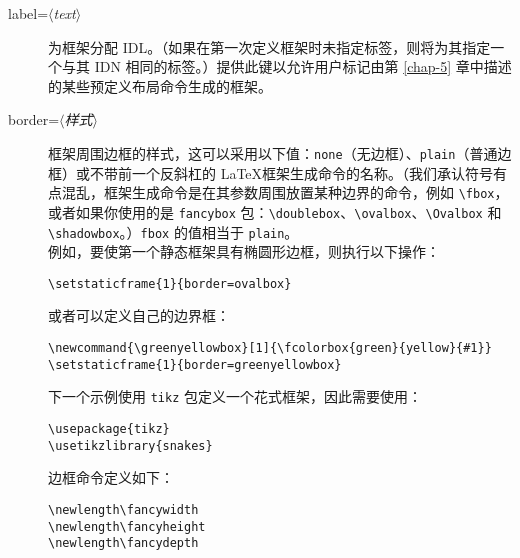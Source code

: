 \documentclass[a4paper]{book}%
\newcommand{\sty}[1]{\texttt{#1}}
\newcommand{\meta}[1]{\textnormal{\ensuremath{\langle}\makebox[0pt][l]{}\emph{#1}\makebox[0pt][l]{}\ensuremath{\rangle}}}
\newcommand{\cmd}[1]{\texttt{#1}}
\begin{document}
\begin{description}
    \item[label=\meta{text}] 为框架分配 IDL。（如果在第一次定义框架时未指定标签，则将为其指定一个与其 IDN 相同的标签。）提供此键以允许用户标记由第 \ref{chap-5} 章中描述的某些预定义布局命令生成的框架。
    \item[border=\meta{样式}] 框架周围边框的样式，这可以采用以下值：\cmd{none}（无边框）、\cmd{plain}（普通边框）或不带前一个反斜杠的 \LaTeX 框架生成命令的名称。（我们承认符号有点混乱，框架生成命令是在其参数周围放置某种边界的命令，例如 \verb|\fbox|，或者如果你使用的是 \sty{fancybox} 包：\verb|\doublebox|、\verb|\ovalbox|、\verb|\Ovalbox| 和 \verb|\shadowbox|。）\cmd{fbox} 的值相当于 \cmd{plain}。\\
    例如，要使第一个静态框架具有椭圆形边框，则执行以下操作：
    \begin{mdframed}[backgroundcolor=white]
    \verb|\setstaticframe{1}{border=ovalbox}|
    \end{mdframed}
    或者可以定义自己的边界框：
\begin{lstlisting}[backgroundcolor=\color{white}]
\newcommand{\greenyellowbox}[1]{\fcolorbox{green}{yellow}{#1}}
\setstaticframe{1}{border=greenyellowbox}
\end{lstlisting}
    下一个示例使用 \sty{tikz} 包定义一个花式框架，因此需要使用：
\begin{lstlisting}[backgroundcolor=\color{white}]
\usepackage{tikz}
\usetikzlibrary{snakes}
\end{lstlisting}
    边框命令定义如下：
\begin{lstlisting}[backgroundcolor=\color{white}]
\newlength\fancywidth
\newlength\fancyheight
\newlength\fancydepth


\end{lstlisting}
\end{description}
\end{document}
